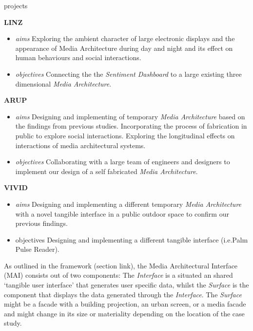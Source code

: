 \begin{singlespace}
{\begin{labeling}{projects}
\item [\textbf{LINZ}] 
\begin {itemize}
\footnotesize
\item [\textit{aims}] Exploring the ambient character of large electronic displays and the appearance of Media Architecture during day and night and its effect on human behaviours and social interactions.  
\item [\textit{objectives}]Connecting the the \textit{Sentiment Dashboard} to a large existing three dimensional \textit{Media Architecture}.
\end{itemize}

\item [\textbf{ARUP}]
\begin {itemize}
\footnotesize
\item [\textit{aims}] Designing and implementing of temporary \textit{Media Architecture} based on the findings from previous studies.  \newline Incorporating the process of fabrication in public to explore social interactions. \newline Exploring the longitudinal effects on interactions of media architectural systems.
\item [\textit{objectives}] Collaborating with a large team of engineers and designers to implement our design of a self fabricated \textit{Media Architecture}.
\end{itemize}

\item [\textbf{VIVID}] 
\begin {itemize}
\footnotesize
\item [\textit{aims}] Designing and implementing a different temporary \textit{Media Architecture} with a novel tangible interface in a public outdoor space to confirm our previous findings.
\item [{objectives}] Designing and implementing a different tangible interface (i.e.{Palm Pulse Reader}). 
\end{itemize}

\end{labeling}
}
  
  \end{singlespace}



As outlined in the framework (section link), the Media Architectural Interface (MAI) consists out of two components: 
The \textit{Interface} is a situated an shared ‘tangible user interface’ that generates user specific data, whilst the \textit{Surface} is the component that displays the data generated through the \textit{Interface}. 
The \textit{Surface} might be a facade with a building projection, an urban screen, or a media facade and might change in its size or materiality depending on the location of the case study. 

